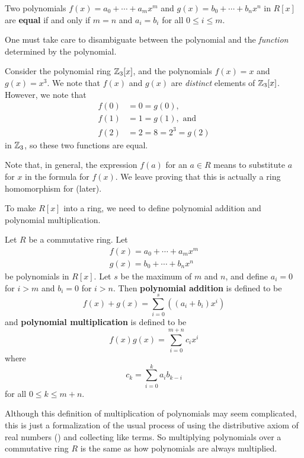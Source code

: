 \begin{definition}
    Two polynomials $f(x) = a_0 + \cdots + a_mx^m$ and $g(x) = b_0 + \cdots + b_nx^n$ in $R[x]$ are \textbf{equal} if and only if $m = n$ and $a_i = b_i$ for all $0 \leq i \leq m$.
\end{definition}

One must take care to disambiguate between the polynomial and the \textit{function} determined by the polynomial.
\begin{example}
    Consider the polynomial ring $\mathbb{Z}_3[x]$, and the polynomials $f(x) = x$ and $g(x) = x^3$. We note that $f(x)$ and $g(x)$ are \textit{distinct} elements of $\mathbb{Z}_3[x]$. However, we note that
    \begin{align*}
        f(0) &= 0 = g(0),\\
        f(1) &= 1 = g(1), \text{ and }\\
        f(2) &= 2 = 8 = 2^3 = g(2)
    \end{align*}
    in $\mathbb{Z}_3$, so these two functions are equal.
\end{example}

Note that, in general, the expression $f(a)$ for an $a \in R$ means to substitute $a$ for $x$ in the formula for $f(x)$. We leave proving that this is actually a ring homomorphism for  (later).

To make $R[x]$ into a ring, we need to define polynomial addition and polynomial multiplication.
\begin{definition}
    Let $R$ be a commutative ring. Let
    \begin{gather*}
        f(x) = a_0 + \cdots + a_mx^m\\
        g(x) = b_0 + \cdots + b_nx^n
    \end{gather*}
    be polynomials in $R[x]$. Let $s$ be the maximum of $m$ and $n$, and define $a_i = 0$ for $i > m$ and $b_i = 0$ for $i > n$. Then \textbf{polynomial addition} is defined to be
    \[
        f(x)+g(x) = \sum_{i=0}^s\left((a_i+b_i)x^i\right)
    \]
    and \textbf{polynomial multiplication} is defined to be
    \[
        f(x)g(x) = \sum_{i=0}^{m+n}c_ix^i
    \]
    where
    \[
        c_k = \sum_{i=0}^k a_ib_{k-i}
    \]
    for all $0 \leq k \leq m + n$.
\end{definition}
Although this definition of multiplication of polynomials may seem complicated, this is just a formalization of the usual process of using the distributive axiom of real numbers () and collecting like terms. So multiplying polynomials over a commutative ring $R$ is the same as how polynomials are always multiplied.

